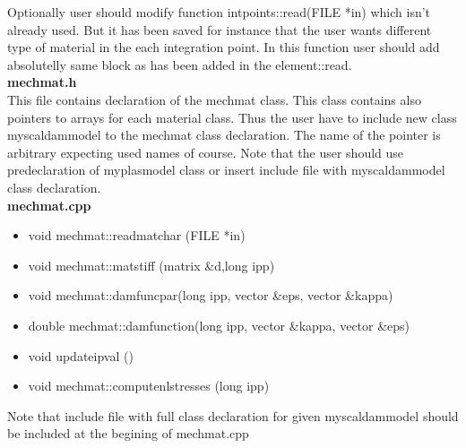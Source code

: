 Optionally user should modify function {\sf intpoints::read(FILE *in)} which isn't already used.
But it has been saved for instance that the user wants different type of material in the each
integration point. In this function user should add absolutelly same block as has been added in the
element::read.\\

{\bf mechmat.h}\\
This file contains declaration of the {\sf mechmat} class. This class contains also pointers to arrays for each
material class. Thus the user have to include new class {\sf myscaldammodel} to the {\sf mechmat} class declaration.
The name of the pointer is arbitrary expecting used names of course. Note that the user should use predeclaration
of {\sf myplasmodel} class or insert include file with {\sf myscaldammodel} class declaration.\\


{\bf mechmat.cpp}\\
\begin{itemize}
\item {\sf void mechmat::readmatchar (FILE *in)}
\item {\sf void mechmat::matstiff (matrix \&d,long ipp)}
\item {\sf void mechmat::damfuncpar(long ipp, vector \&eps, vector \&kappa)}
\item {\sf double mechmat::damfunction(long ipp, vector \&kappa, vector \&eps)}
\item {\sf void updateipval ()}
\item {\sf void mechmat::computenlstresses (long ipp)}
\end{itemize}
Note that include file with full class declaration for given {\sf myscaldammodel} should be included at the begining
of mechmat.cpp\\

